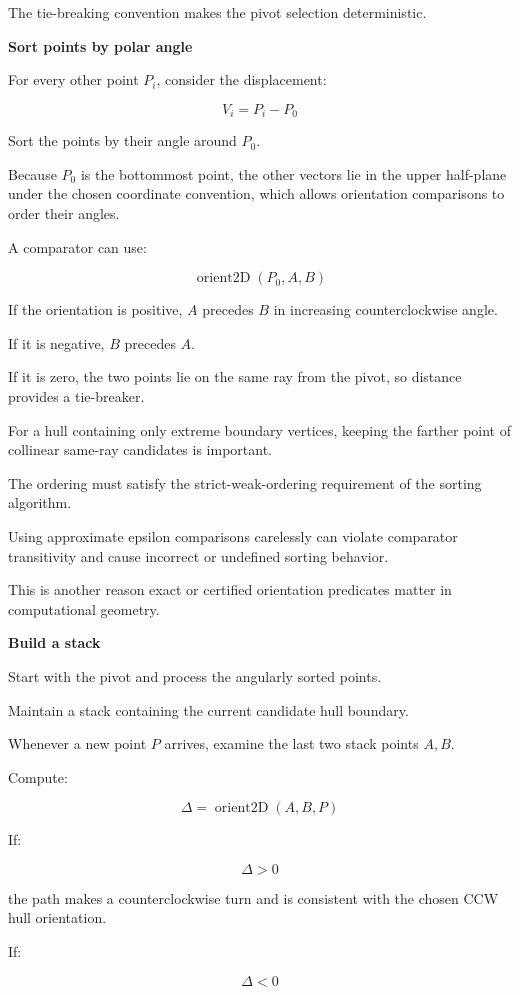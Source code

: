 The tie-breaking convention makes the pivot selection deterministic.

\textbf{Sort points by polar angle}

For every other point \(P_i\), consider the displacement:

\[
V_i=P_i-P_0
\]

Sort the points by their angle around \(P_0\).

Because \(P_0\) is the bottommost point, the other vectors lie in the upper half-plane under the chosen coordinate convention, which allows orientation comparisons to order their angles.

A comparator can use:

\[
\operatorname{orient2D}(P_0,A,B)
\]

If the orientation is positive, \(A\) precedes \(B\) in increasing counterclockwise angle.

If it is negative, \(B\) precedes \(A\).

If it is zero, the two points lie on the same ray from the pivot, so distance provides a tie-breaker.

For a hull containing only extreme boundary vertices, keeping the farther point of collinear same-ray candidates is important.

The ordering must satisfy the strict-weak-ordering requirement of the sorting algorithm.

Using approximate epsilon comparisons carelessly can violate comparator transitivity and cause incorrect or undefined sorting behavior.

This is another reason exact or certified orientation predicates matter in computational geometry.

\textbf{Build a stack}

Start with the pivot and process the angularly sorted points.

Maintain a stack containing the current candidate hull boundary.

Whenever a new point \(P\) arrives, examine the last two stack points \(A,B\).

Compute:

\[
\Delta=\operatorname{orient2D}(A,B,P)
\]

If:

\[
\Delta>0
\]

the path makes a counterclockwise turn and is consistent with the chosen CCW hull orientation.

If:

\[
\Delta<0
\]

